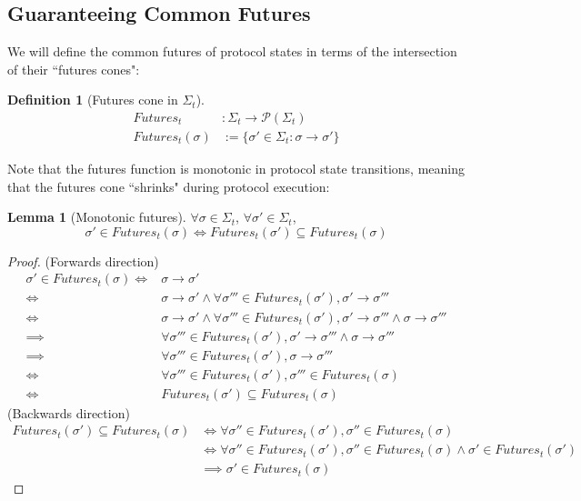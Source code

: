 \documentclass{article}
\theoremstyle{definition}
\newtheorem{lemma}{Lemma}
\newtheorem{defn}{Definition}[section]
\begin{document}
\subsection{Guaranteeing Common Futures}

We will define the common futures of protocol states in terms of the intersection of their ``futures cones":

\begin{defn}[Futures cone in $\Sigma_t$]
\begin{align}
Futures_t&: \Sigma_t \to \mathcal{P}( \Sigma_t) \\
Futures_t(\sigma) &:= \{ \sigma' \in \Sigma_t : \sigma \to \sigma'  \}
\end{align}
\end{defn}

Note that the futures function is monotonic in protocol state transitions, meaning that the futures cone ``shrinks" during protocol execution:

\begin{lemma}[Monotonic futures]
$\forall \sigma \in \Sigma_t$, $\forall \sigma' \in \Sigma_t$,
$$
\sigma' \in Futures_t(\sigma) \iff Futures_t(\sigma') \subseteq Futures_t(\sigma)
$$
\end{lemma}

\begin{proof}
(Forwards direction)
\begin{align}
\sigma' \in Futures_t(\sigma)\iff &\sigma \to \sigma' \\
\iff &\sigma \to \sigma' \land \forall \sigma''' \in Futures_t(\sigma'), \sigma' \to \sigma''' \\
\iff &\sigma \to \sigma' \land \forall \sigma''' \in Futures_t(\sigma'), \sigma' \to \sigma''' \land \sigma \to \sigma''' \\
\implies &\forall \sigma''' \in Futures_t(\sigma'), \sigma' \to \sigma''' \land \sigma \to \sigma''' \\
\implies &\forall \sigma''' \in Futures_t(\sigma'), \sigma \to \sigma''' \\
\iff &\forall \sigma''' \in Futures_t(\sigma'), \sigma''' \in Futures_t(\sigma) \\
\iff &Futures_t(\sigma') \subseteq Futures_t(\sigma)
\end{align}
(Backwards direction)
\begin{align}
Futures_t(\sigma') \subseteq Futures_t(\sigma) &\iff \forall \sigma'' \in Futures_t(\sigma'), \sigma'' \in Futures_t(\sigma)\\
&\iff \forall \sigma'' \in Futures_t(\sigma'), \sigma'' \in Futures_t(\sigma) \land \sigma' \in Futures_t(\sigma')\\
&\implies \sigma' \in Futures_t(\sigma)
\end{align}
\end{proof}
\end{document}
